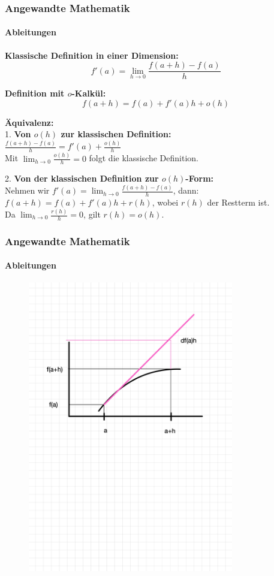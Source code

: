 \documentclass{beamer}
\begin{document}
\begin{frame}
    \frametitle{Angewandte Mathematik}
    \framesubtitle{Ableitungen}
    \textbf{Klassische Definition in einer Dimension:}
    \[
    f'(a) = \lim_{h \to 0} \frac{f(a + h) - f(a)}{h}
    \]
    
    \textbf{Definition mit \( o \)-Kalkül:}
    \[
    f(a + h) = f(a) + f'(a)h + o(h)
    \]
  
    \textbf{Äquivalenz:} \\
    \vspace{0.2cm}
    1. \textbf{Von \( o(h) \) zur klassischen Definition:} \\
    \quad \( \frac{f(a + h) - f(a)}{h} = f'(a) + \frac{o(h)}{h} \) \\
    \quad Mit \( \lim_{h \to 0} \frac{o(h)}{h} = 0 \) folgt die klassische Definition.
    
    \vspace{0.3cm}
    2. \textbf{Von der klassischen Definition zur \( o(h) \)-Form:} \\
    \quad Nehmen wir \( f'(a) = \lim_{h \to 0} \frac{f(a + h) - f(a)}{h} \), dann: \\
    \quad \( f(a + h) = f(a) + f'(a)h + r(h) \), wobei \( r(h) \) der Restterm ist. \\
    \quad Da \( \lim_{h \to 0} \frac{r(h)}{h} = 0 \), gilt \( r(h) = o(h) \).
    
  \end{frame}
  
  \begin{frame}
    \frametitle{Angewandte Mathematik}
    \framesubtitle{Ableitungen}

\begin{figure}[H]
      \centering
    \includegraphics[width=0.8\textwidth]{images/df}
\end{figure}

 \end{frame}
\end{document}
